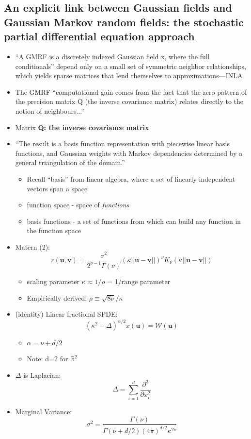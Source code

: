 \documentclass{article}
\begin{document}
\subsection*{An explicit link between Gaussian fields and Gaussian Markov random fields: the stochastic partial differential equation approach \citep{Lindgren2011}}
\begin{itemize}
\item ``A GMRF is a discretely indexed Gaussian field x, where the full conditionals'' depend only on a small set of symmetric neighbor relationships, which yields sparse matrices that lend themselves to approximations---INLA
\item The GMRF ``computational gain comes from the fact that the zero pattern of the precision matrix Q (the inverse covariance matrix) relates directly to the notion of neighbours...''
\item Matrix {\bf Q: the inverse covariance matrix}
\item ``The result is a basis function representation with piecewise linear basis functions, and Gaussian weights with Markov dependencies determined by a general triangulation of the domain.''
  \begin{itemize}
  \item Recall ``basis'' from linear algebra, where a set of linearly independent vectors span a space
  \item function space - space of {\it functions}
  \item basis functions - a set of functions from which can build any function in the function space
  \end{itemize}

\item Matern (2):
$$r(\pmb{u}, \pmb{v}) = \frac{\sigma^{2}}{2^{\nu - 1}\Gamma(\nu)}(\kappa||\pmb{u} - \pmb{v}||)^{\nu}K_{\nu}(\kappa||\pmb{u} - \pmb{v}||)$$
      \begin{itemize}
      \item scaling parameter $\kappa \approx 1/\rho$ = 1/range parameter
      \item Empirically derived: $\rho \equiv \sqrt{8\nu}/\kappa$
      \end{itemize}
\item (identity) Linear fractional SPDE:
$$ (\kappa^{2} - \Delta)^{\alpha/2} x(\pmb{u}) = \mathcal{W}(\pmb{u}) $$
      \begin{itemize}
      \item $\alpha = \nu + d/2$
      \item Note: d=2 for $\mathbb{R}^{2}$
      \end{itemize}
\item $\Delta$ is Laplacian:
$$ \Delta = \sum_{i=1}^{d} \frac{\partial^{2}}{\partial x_{i}^{2}} $$
\item Marginal Variance:
$$\sigma^{2} = \frac{\Gamma(\nu)}{\Gamma(\nu + d/2)(4\pi)^{d/2}\kappa^{2\nu}}$$
\end{itemize}
\end{document}
